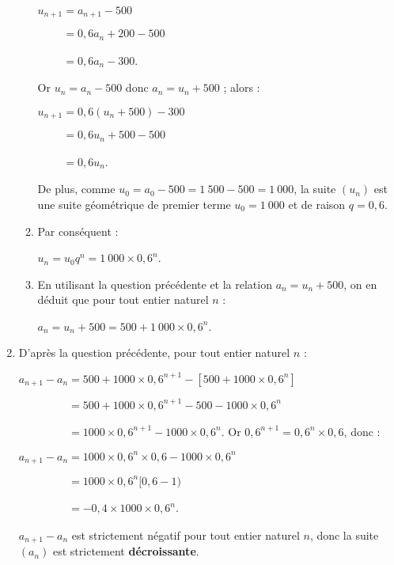 \begin{corrige}
\begin{enumerate}
\begin{enumerate}[label=\alph*.]
               $u_{n+1}=a_{n+1}-500$
               \par
               $\phantom{u_{n+1}}=0,6a_n+200-500$
               \par
               $\phantom{u_{n+1}}=0,6a_n-300$.
               \par
               Or $u_n=a_n-500$ donc $a_n=u_n+500$ ; alors :
               \par
               $u_{n+1}=0,6(u_n+500)-300$
               \par
               $\phantom{u_{n+1}}=0,6u_n+500-500$
               \par
               $\phantom{u_{n+1}}=0,6u_n$.
               \par
               De plus, comme ${u_0=a_0-500=1~500-500=1~000}$, la suite $(u_n)$ est une suite géométrique de premier terme ${u_0=1~000}$ et de raison ${q=0,6}$.
               \item %
               Par conséquent :
               \par
               $u_n=u_0q^n=1~000 \times 0,6^n$.
               \item %
               En utilisant la question précédente et la relation ${a_n=u_n+500}$, on en déduit que pour tout entier naturel $n$ :
               \par
               $a_n=u_n+500=500+1~000 \times 0,6^n$.
               \par
          \end{enumerate}
          \item %
          D'après la question précédente, pour tout entier naturel $n$ :
          \par
          $a_{n+1}-a_n=500+1000 \times 0,6^{n+1}-\left[500+1000 \times 0,6^n\right]$
          \par
          $\phantom{a_{n+1}-a_n}=500+1000 \times 0,6^{n+1}-500-1000 \times 0,6^n$
          \par
          $\phantom{a_{n+1}-a_n}=1000 \times 0,6^{n+1}-1000 \times 0,6^n$.
\medskip
          Or $0,6^{n+1}=0,6^n \times 0,6$, donc :
          \par
          $a_{n+1}-a_n=1000 \times 0,6^n \times 0,6-1000 \times 0,6^n$
          \par
          $\phantom{a_{n+1}-a_n}=1000 \times 0,6^{n}[0,6-1)$
          \par
          $\phantom{a_{n+1}-a_n}=-0,4 \times 1000 \times 0,6^{n}$.
          \par
          $a_{n+1}-a_n$ est strictement négatif pour tout entier naturel $n$, donc la suite $(a_n)$ est strictement \textbf{décroissante}.

\end{enumerate}
\end{corrige}
